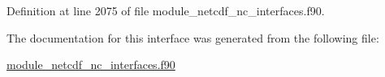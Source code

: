 Definition at line 2075 of file module\+\_\+netcdf\+\_\+nc\+\_\+interfaces.\+f90.



The documentation for this interface was generated from the following file\+:\begin{DoxyCompactItemize}
\item 
\hyperlink{module__netcdf__nc__interfaces_8f90}{module\+\_\+netcdf\+\_\+nc\+\_\+interfaces.\+f90}\end{DoxyCompactItemize}
